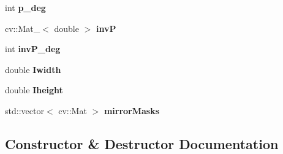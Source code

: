 \begin{DoxyCompactItemize}
\item 
int {\bfseries p\+\_\+deg}\hypertarget{classMultiColSLAM_1_1cCamModelGeneral___a0dcac4bbaef35e9e473589be0fbd4f45}{}\label{classMultiColSLAM_1_1cCamModelGeneral___a0dcac4bbaef35e9e473589be0fbd4f45}

\item 
cv\+::\+Mat\+\_\+$<$ double $>$ {\bfseries invP}\hypertarget{classMultiColSLAM_1_1cCamModelGeneral___a31a0f7be79070b7c73ef2c36e51b5685}{}\label{classMultiColSLAM_1_1cCamModelGeneral___a31a0f7be79070b7c73ef2c36e51b5685}

\item 
int {\bfseries inv\+P\+\_\+deg}\hypertarget{classMultiColSLAM_1_1cCamModelGeneral___ab5124028fda818ec1cbe8bd14168b63f}{}\label{classMultiColSLAM_1_1cCamModelGeneral___ab5124028fda818ec1cbe8bd14168b63f}

\item 
double {\bfseries Iwidth}\hypertarget{classMultiColSLAM_1_1cCamModelGeneral___a82c73c92bfa6a0486aa90b77d97650ac}{}\label{classMultiColSLAM_1_1cCamModelGeneral___a82c73c92bfa6a0486aa90b77d97650ac}

\item 
double {\bfseries Iheight}\hypertarget{classMultiColSLAM_1_1cCamModelGeneral___a7eec8057dd72af77ccf9aa98090b81eb}{}\label{classMultiColSLAM_1_1cCamModelGeneral___a7eec8057dd72af77ccf9aa98090b81eb}

\item 
std\+::vector$<$ cv\+::\+Mat $>$ {\bfseries mirror\+Masks}\hypertarget{classMultiColSLAM_1_1cCamModelGeneral___a34efd33c0c7b74dfd7a93c797c812c1a}{}\label{classMultiColSLAM_1_1cCamModelGeneral___a34efd33c0c7b74dfd7a93c797c812c1a}

\end{DoxyCompactItemize}


\subsection{Constructor \& Destructor Documentation}
